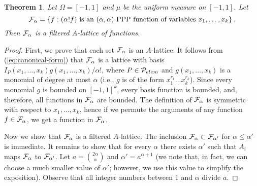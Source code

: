 \documentclass[11pt]{article}
\newcommand {\set}   [1] {\left\{ #1 \right\}}
\newcommand {\calP}   {{\cal{P}}}
\newcommand {\calF}   {{\cal{F}}}
\newtheorem{theorem}{Theorem}
\begin{document}
\begin{theorem}\label{thm:PPP-is-FAL}
Let $\Omega = [-1,1]$ and $\mu$ be the uniform measure on $[-1,1]$.
Let
$$\calF_{\alpha} = \set{f: (\alpha! f) \text{ is an } (\alpha,\alpha)\text{-PPP function of variables } x_1,\dots, x_k}.$$
Then $\calF_{\alpha}$ is a filtered $A$-lattice of functions.
\end{theorem}
\begin{proof}
First, we prove  that each set $\calF_{\alpha}$ is an $A$-lattice.
It follows from (\ref{eq:canonical-form}) that $\calF_{\alpha}$ is a lattice with basis $I_P(x_1,\dots,x_k) g(x_1,\dots,x_k)/\alpha!$,
where $P\in\calP_{elem}$ and $g(x_1,\dots,x_k)$ is a monomial of degree at most $\alpha$ (i.e., $g$ is of the form $x_1^{r_1} \dots x_k^{r_k}$).
Since every monomial $g$ is bounded on $[-1,1]^k$, every basis function is bounded, and, therefore, all functions in $\calF_{\alpha}$ are bounded.
The definition of $\calF_{\alpha}$ is symmetric with respect to $x_1,\dots, x_k$, hence if we permute the arguments of any function $f\in \calF_{\alpha}$,
we get a function in $\calF_{\alpha}$.

Now we show that $\calF_{\alpha}$ is a filtered $A$-lattice. The inclusion $\calF_{\alpha} \subset \calF_{\alpha'}$ for $\alpha\leq \alpha'$ is immediate.
It remains to show that for every $\alpha$ there exists $\alpha'$ such that $A_i$ maps $\calF_{\alpha}$ to $\calF_{\alpha'}$.
Let $a  = \binom{2 \alpha}{\alpha}$ and $\alpha' = a^{\alpha+1}$ (we note that, in fact, we can choose a much smaller value of $\alpha'$;
 however, we use this value to simplify the exposition). Observe  that all integer numbers between $1$ and $\alpha$ divide $a$.


\end{proof}
\end{document}
